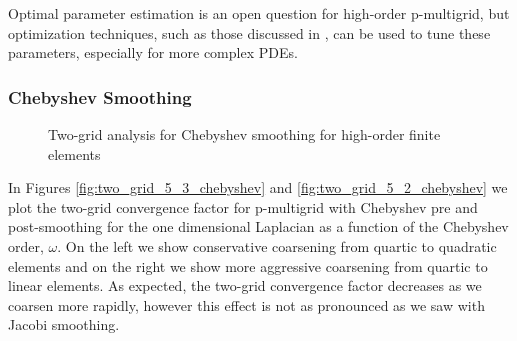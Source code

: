 \documentclass[review]{siamart190516}
\begin{document}
Optimal parameter estimation is an open question for high-order p-multigrid, but optimization techniques, such as those discussed in \cite{brown2021tuning}, can be used to tune these parameters, especially for more complex PDEs.

\subsubsection{Chebyshev Smoothing}

\begin{figure}[!tbp]
  \centering
  \caption{Two-grid analysis for Chebyshev smoothing for high-order finite elements}
\end{figure}

In Figures \ref{fig:two_grid_5_3_chebyshev} and \ref{fig:two_grid_5_2_chebyshev} we plot the two-grid convergence factor for p-multigrid with Chebyshev pre and post-smoothing for the one dimensional Laplacian as a function of the Chebyshev order, $\omega$.
On the left we show conservative coarsening from quartic to quadratic elements and on the right we show more aggressive coarsening from quartic to linear elements.
As expected, the two-grid convergence factor decreases as we coarsen more rapidly, however this effect is not as pronounced as we saw with Jacobi smoothing.
\end{document}
